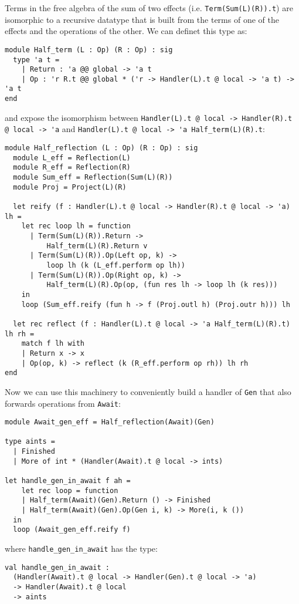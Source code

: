 \documentclass[acmsmall, screen, nonacm]{acmart}
\theoremstyle{definition}
\begin{document}
Terms in the free algebra of the sum of two effects
(i.e. \lstinline[style=oxcaml]{Term(Sum(L)(R)).t}) are isomorphic to a
recursive datatype that is built from the terms of one of the effects
and the operations of the other\cite{??}. We can definet this type as:
\begin{lstlisting}[style=oxcaml]
module Half_term (L : Op) (R : Op) : sig
  type 'a t =
    | Return : 'a @@ global -> 'a t
    | Op : 'r R.t @@ global * ('r -> Handler(L).t @ local -> 'a t) -> 'a t
end
\end{lstlisting}
and expose the isomorphism between
\lstinline[style=oxcaml]{Handler(L).t @ local -> Handler(R).t @ local -> 'a}
and \lstinline[style=oxcaml]{Handler(L).t @ local -> 'a Half_term(L)(R).t}:
\begin{lstlisting}[style=oxcaml]
module Half_reflection (L : Op) (R : Op) : sig
  module L_eff = Reflection(L)
  module R_eff = Reflection(R)
  module Sum_eff = Reflection(Sum(L)(R))
  module Proj = Project(L)(R)

  let reify (f : Handler(L).t @ local -> Handler(R).t @ local -> 'a) lh =
    let rec loop lh = function
      | Term(Sum(L)(R)).Return ->
          Half_term(L)(R).Return v
      | Term(Sum(L)(R)).Op(Left op, k) ->
          loop lh (k (L_eff.perform op lh))
      | Term(Sum(L)(R)).Op(Right op, k) ->
          Half_term(L)(R).Op(op, (fun res lh -> loop lh (k res)))
    in
    loop (Sum_eff.reify (fun h -> f (Proj.outl h) (Proj.outr h))) lh

  let rec reflect (f : Handler(L).t @ local -> 'a Half_term(L)(R).t) lh rh =
    match f lh with
    | Return x -> x
    | Op(op, k) -> reflect (k (R_eff.perform op rh)) lh rh
end
\end{lstlisting}

Now we can use this machinery to conveniently build a handler of
\lstinline[style=oxcaml]{Gen} that also forwards operations from
\lstinline[style=oxcaml]{Await}:
\begin{lstlisting}[style=oxcaml]
module Await_gen_eff = Half_reflection(Await)(Gen)

type aints =
  | Finished
  | More of int * (Handler(Await).t @ local -> ints)

let handle_gen_in_await f ah =
    let rec loop = function
    | Half_term(Await)(Gen).Return () -> Finished
    | Half_term(Await)(Gen).Op(Gen i, k) -> More(i, k ())
  in
  loop (Await_gen_eff.reify f)
\end{lstlisting}
where \lstinline[style=oxcaml]{handle_gen_in_await} has the type:
\begin{lstlisting}[style=oxcaml]
val handle_gen_in_await :
  (Handler(Await).t @ local -> Handler(Gen).t @ local -> 'a)
  -> Handler(Await).t @ local
  -> aints
\end{lstlisting}
\end{document}
